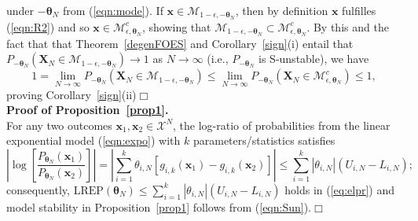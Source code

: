 \documentclass[12pt]{article}
\theoremstyle{definition}
\newcommand{\REP}{\mathrm{LREP}}
\begin{document}
  under $-\boldsymbol \theta_N$ from (\ref{eqn:mode}).  If  $\boldsymbol x \in\mathcal{M}_{1-\epsilon, -\boldsymbol \theta_N}$, then by definition $\boldsymbol x$ fulfilles (\ref{eqn:R2}) and so $\boldsymbol x \in \mathcal{M}_{\epsilon, \boldsymbol \theta_N}^c $, showing that $\mathcal{M}_{1-\epsilon, -\boldsymbol \theta_N} \subset \mathcal{M}_{\epsilon, \boldsymbol \theta_N}^c $.
   By this and the fact that that Theorem~\ref{degenFOES} and Corollary~\ref{sign}(i) entail that
  $P_{-\boldsymbol \theta_N}(\boldsymbol X_N \in \mathcal{M}_{1-\epsilon, -\boldsymbol \theta_N})\to 1$ as $N\to \infty$ (i.e., $P_{-\boldsymbol \theta_N}$ is S-unstable), we have
  \[
    1  = \lim_{N\to \infty} P_{-\boldsymbol \theta_N}(\boldsymbol X_N \in \mathcal{M}_{1-\epsilon, -\boldsymbol \theta_N}) \leq \lim_{N\to \infty} P_{-\boldsymbol \theta_N}(\boldsymbol X_N \in \mathcal{M}_{\epsilon, \boldsymbol \theta_N}^c ) \leq 1,
  \]
   proving  Corollary~\ref{sign}(ii)\hfill \(\Box\)\\


\noindent\textbf{Proof of Proposition~\ref{prop1}.}\\
For any two outcomes $\boldsymbol x_1, \boldsymbol x_2\in\mathcal{X}^N$, the log-ratio of probabilities from the linear exponential model (\ref{eqn:expo}) with $k$ parameters/statistics satisfies
\[
\left|\log \left[ \frac{P_{\boldsymbol \theta_N}(\boldsymbol x_1)}{P_{\boldsymbol \theta_N}(\boldsymbol x_2)}  \right] \right| =
 \left|  \sum_{i=1}^k \theta_{i,N} [g_{i,k}(\boldsymbol x_1) - g_{i,k}(\boldsymbol x_2) ] \right|  \leq  \sum_{i=1}^k | \theta_{i,N}| (U_{i,N}-L_{i,N});
\]
consequently,   $\REP(\boldsymbol \theta_N )  \leq  \sum_{i=1}^k | \theta_{i,N}| (U_{i,N}-L_{i,N})$ holds in (\ref{eq:elpr}) and model stability in Proposition~\ref{prop1}
follows from (\ref{eqn:Sun}).\hfill \(\Box\)\\
\end{document}
